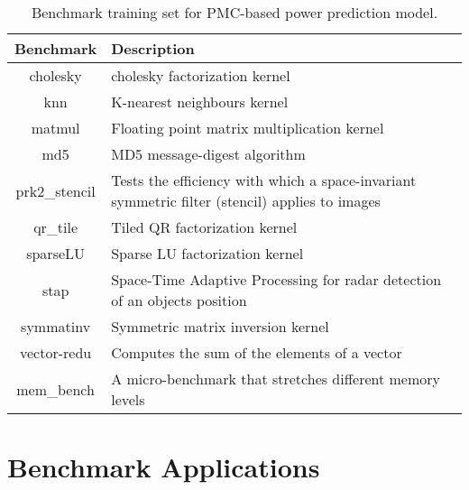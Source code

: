 \begin{table}
        \centering
        \caption{Benchmark training set for PMC-based power prediction model.}
        \label{tab:training_set}
				\def\arraystretch{1.5}%
				\begin{tabular}{ | c | m{12cm} | }
                \hline
                \textbf{Benchmark} & \textbf{Description} \\
                \hline
                \hline
                cholesky & cholesky factorization kernel \\
                \hline
                knn & K-nearest neighbours kernel \\
                \hline
                matmul & Floating point matrix multiplication kernel \\
                \hline
                md5 & MD5 message-digest algorithm \\
                \hline
                prk2\_stencil & Tests the efficiency with which a space-invariant symmetric filter (stencil) applies to images \\
                \hline
                qr\_tile & Tiled QR factorization kernel \\
                \hline
                sparseLU & Sparse LU factorization kernel\\
                \hline
                stap & Space-Time Adaptive Processing for radar detection of an objects position \\
                \hline
                symmatinv & Symmetric matrix inversion kernel \\
                \hline
                vector-redu & Computes the sum of the elements of a vector \\
                \hline
                mem\_bench & A micro-benchmark that stretches different memory levels \\
                \hline
        \end{tabular}
\end{table}


\section{Benchmark Applications}
